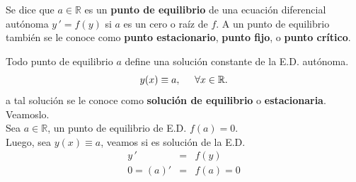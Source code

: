 \documentclass{beamer}
\begin{document}
\begin{frame}[t]
	\vspace{-4mm}
	\begin{definition}
		Se dice que \(a \in \mathbb{R}\) es un \textbf{punto de equilibrio} de una ecuación diferencial autónoma \(y\,' =f(y)\) si \(a\) es un cero o raíz de \(f\). A un punto de equilibrio también se le conoce como \textbf{punto estacionario}, \textbf{punto fijo}, o \textbf{punto crítico}. 
	\end{definition}
	Todo punto de equilibrio \(a\) define una solución constante de la E.D. autónoma.
	\[
		y(x) \equiv a, \hspace{5mm} \forall x \in \mathbb{R} .
	\]
	a tal solución se le conoce como \textbf{solución de equilibrio} o \textbf{estacionaria}. Veamoslo.\\
	Sea \(a \in \mathbb{R}\), un punto de equilibrio de E.D. \(f(a) =0\).\\
	Luego, sea \(y(x) \equiv a\), veamos si es solución de la E.D.
	\[
		\begin{array}{rcl}
			y\,' & = & f(y) \\[2mm]
			0 = (a) ' & = & f(a) =0
		\end{array}
	\]
\end{frame}
\end{document}
